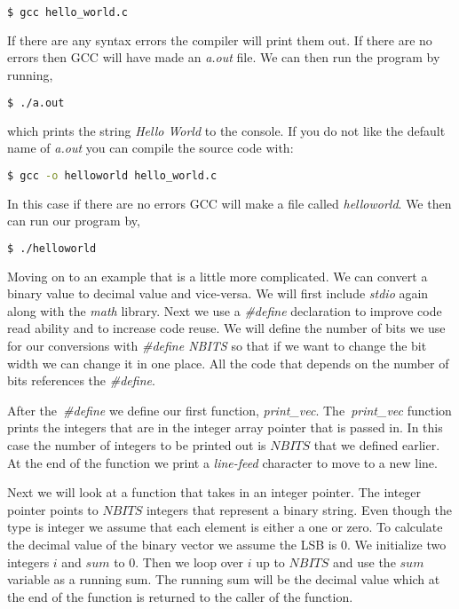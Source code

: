 \begin{lstlisting}[language=bash]
    $ gcc hello_world.c 
\end{lstlisting}

If there are any syntax errors the compiler will print them out. If there are no errors then \ac{GCC} will have made an \emph{a.out} file. We can then run the program by running,

\begin{lstlisting}[language=bash]
    $ ./a.out 
\end{lstlisting}

which prints the string \emph{Hello World} to the console. If you do not like the default name of \emph{a.out} you can compile the source code with:

\begin{lstlisting}[language=bash]
    $ gcc -o helloworld hello_world.c 
\end{lstlisting}

In this case if there are no errors \ac{GCC} will make a file called \emph{helloworld}. We then can run our program by,

\begin{lstlisting}[language=bash]
    $ ./helloworld
\end{lstlisting}

Moving on to an example that is a little more complicated. We can convert a binary value to decimal value and vice-versa. We will first include \emph{stdio} again along with the \emph{math} library. Next we use a \emph{\#define} declaration to improve code read ability and to increase code reuse. We will define the number of bits we use for our conversions with \emph{\#define NBITS} so that if we want to change the bit width we can change it in one place. All the code that depends on the number of bits references the \emph{\#define}.

After the \emph{\#define} we define our first function, \emph{print\_vec}. The \emph{print\_vec} function prints the integers that are in the integer array pointer that is passed in. In this case the number of integers to be printed out is $NBITS$ that we defined earlier. At the end of the function we print a \emph{line-feed} character to move to a new line. 

Next we will look at a function that takes in an integer pointer. The integer pointer points to $NBITS$ integers that represent a binary string. Even though the type is integer we assume that each element is either a one or zero. To calculate the decimal value of the binary vector we assume the \ac{LSB} is $0$. We initialize two integers $i$ and $sum$ to $0$. Then we loop over $i$ up to $NBITS$ and use the $sum$ variable as a running sum. The running sum will be the decimal value which at the end of the function is returned to the caller of the function. 

